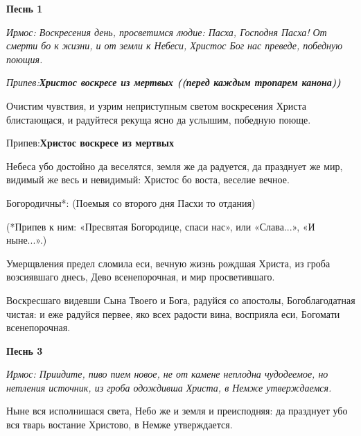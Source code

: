 


 

 
\bfseries Песнь 1 

\normalfont{}\itshape Ирмос\normalfont{}: Воскресения день, просветимся людие: Пасха, Господня Пасха! От смерти бо к жизни, и от земли к Небеси, Христос Бог нас преведе, победную поющия. 

\itshape Припев\normalfont{}:\bfseries  Христос воскресе из мертвых\normalfont{} ((перед каждым тропарем канона))



Очистим чувствия, и узрим неприступным светом воскресения Христа блистающася, и радуйтеся рекуща ясно да услышим, победную поюще. \itshape 

Припев\normalfont{}:\bfseries  Христос воскресе из мертвых\normalfont{} 





Небеса убо достойно да веселятся, земля же да радуется, да празднует же мир, видимый же весь и невидимый: Христос бо воста, веселие вечное. \itshape 

Богородичны*:  (Поемыя со второго дня Пасхи то отдания) \normalfont{}

(*Припев к ним: «Пресвятая Богородице, спаси нас», или «Слава...», «И ныне...».)

Умерщвления предел сломила еси, вечную жизнь рождшая Христа, из гроба возсиявшаго днесь, Дево всенепорочная, и мир просветившаго.     



Воскресшаго видевши Сына Твоего и Бога, радуйся со апостолы, Богоблагодатная чистая: и еже радуйся первее, яко всех радости вина, восприяла еси, Богомати всенепорочная. 

\medskip\bfseries Песнь 3 

\normalfont{}\itshape Ирмос\normalfont{}: Приидите, пиво пием новое, не от камене неплодна чудодеемое, но нетления источник, из гроба одождивша Христа, в Немже утверждаемся. 



Ныне вся исполнишася света, Небо же и земля и преисподняя: да празднует убо вся тварь востание Христово, в Немже утверждается. 



